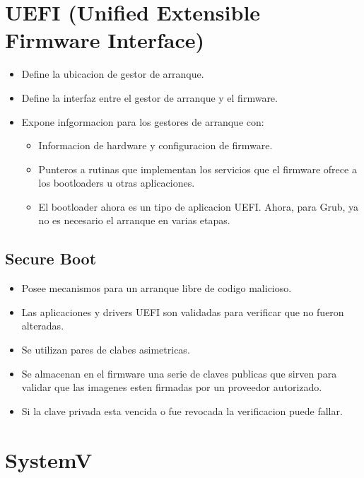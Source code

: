 \documentclass[11pt]{article}
\begin{document}
\section{UEFI (Unified Extensible Firmware Interface)}
\begin{itemize}
    \item Define la ubicacion de gestor de arranque.
    \item Define la interfaz entre el gestor de arranque y el firmware.
    \item Expone infgormacion para los gestores de arranque con:
        \begin{itemize}
            \item Informacion de hardware y configuracion de firmware.
            \item Punteros a rutinas que implementan los servicios que el firmware ofrece a los bootloaders u otras aplicaciones.
            \item El bootloader ahora es un tipo de aplicacion UEFI. Ahora, para Grub, ya no es necesario el arranque en varias etapas.
        \end{itemize}
\end{itemize}
\subsection{Secure Boot}
\begin{itemize}
    \item Posee mecanismos para un arranque libre de codigo malicioso.
    \item Las aplicaciones y drivers UEFI son validadas para verificar que no fueron alteradas.
    \item Se utilizan pares de clabes asimetricas.
    \item Se almacenan en el firmware una serie de claves publicas que sirven para validar que las imagenes esten firmadas por un proveedor autorizado.
    \item Si la clave privada esta vencida o fue revocada la verificacion puede fallar.
\end{itemize}

\section{SystemV}
\end{document}
